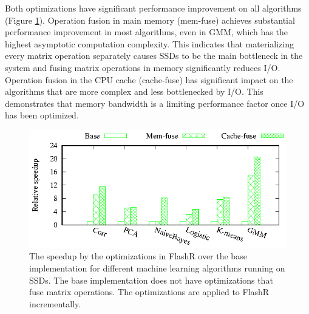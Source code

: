 Both optimizations have significant performance improvement on all algorithms
(Figure \ref{perf:em_opts}). Operation fusion in main memory (mem-fuse) achieves
substantial performance improvement in most algorithms, even in GMM,
which has the highest asymptotic computation complexity.
This indicates that materializing every matrix operation
separately causes SSDs to be the main bottleneck in the system and
fusing matrix operations in memory significantly reduces I/O.
Operation fusion in the CPU cache (cache-fuse) has significant impact
on the algorithms that are more complex and less bottlenecked by I/O.
This demonstrates that memory bandwidth is a limiting performance factor
once I/O has been optimized.

\begin{figure}
	\begin{center}
		\footnotesize
		\includegraphics{FlashMatrix_figs/opts-EM.eps}
		\vspace{-10pt}
		\caption{The speedup by the optimizations in FlashR over the base
		implementation for different machine learning algorithms running on SSDs.
		The base implementation does not have optimizations that fuse matrix
		operations. The optimizations are applied to FlashR incrementally.}
		\label{perf:em_opts}
	\end{center}
\end{figure}
